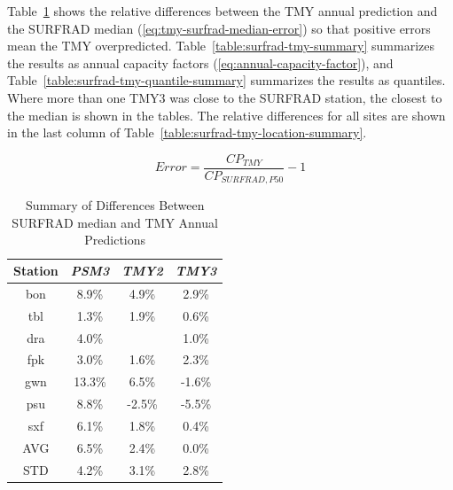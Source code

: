 \documentclass[conference]{IEEEtran}
\begin{document}
Table~\ref{table:surfrad-tmy-errors-summary} shows the relative differences between the TMY annual prediction and the SURFRAD median (\ref{eq:tmy-surfrad-median-error}) so that positive errors mean the TMY overpredicted. Table~\ref{table:surfrad-tmy-summary} summarizes the results as annual capacity factors (\ref{eq:annual-capacity-factor}), and Table~\ref{table:surfrad-tmy-quantile-summary} summarizes the results as quantiles. Where more than one TMY3 was close to the SURFRAD station, the closest to the median is shown in the tables. The relative differences for all sites are shown in the last column of Table~\ref{table:surfrad-tmy-location-summary}.

\begin{equation}
Error = \frac{CP_{TMY}}{CP_{SURFRAD,P50}}-1 \label{eq:tmy-surfrad-median-error}
\end{equation}

\begin{table}[htbp]
\caption{Summary of Differences Between SURFRAD median and TMY Annual Predictions}
\begin{center}
\begin{tabular}{|c|c|c|c|}
\hline
\textbf{Station}&\textbf{\textit{PSM3}}&\textbf{\textit{TMY2}}&\textbf{\textit{TMY3}} \\
\hline
bon&8.9\%&4.9\%&2.9\% \\
tbl&1.3\%&1.9\%&0.6\% \\
dra&4.0\%&     &1.0\% \\
fpk&3.0\%&1.6\%&2.3\% \\
gwn&13.3\%&6.5\%&-1.6\% \\
psu&8.8\%&-2.5\%&-5.5\% \\
sxf&6.1\%&1.8\%&0.4\% \\
\hline
AVG&6.5\%&2.4\%&0.0\% \\
STD&4.2\%&3.1\%&2.8\% \\
\hline
\end{tabular}
\label{table:surfrad-tmy-errors-summary}
\end{center}
\end{table}
\end{document}
